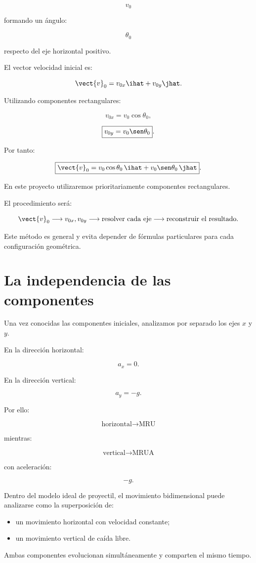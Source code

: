 \[
v_0
\]

formando un ángulo:

\[
\theta_0
\]

respecto del eje horizontal positivo.

El vector velocidad inicial es:

\[
\vect{v}_0
=
v_{0x}\ihat+v_{0y}\jhat.
\]

Utilizando componentes rectangulares:

\[
\boxed{
v_{0x}=v_0\cos\theta_0
},
\]

\[
\boxed{
v_{0y}=v_0\sen\theta_0
}.
\]

Por tanto:

\[
\boxed{
\vect{v}_0
=
v_0\cos\theta_0\,\ihat
+
v_0\sen\theta_0\,\jhat
}.
\]

\begin{recordatorio}
En este proyecto utilizaremos prioritariamente componentes rectangulares.

El procedimiento será:

\[
\vect{v}_0
\longrightarrow
v_{0x},v_{0y}
\longrightarrow
\text{resolver cada eje}
\longrightarrow
\text{reconstruir el resultado}.
\]

Este método es general y evita depender de fórmulas particulares para cada
configuración geométrica.
\end{recordatorio}


\section{La independencia de las componentes}

Una vez conocidas las componentes iniciales, analizamos por separado los ejes
\(x\) y \(y\).

En la dirección horizontal:

\[
a_x=0.
\]

En la dirección vertical:

\[
a_y=-g.
\]

Por ello:

\[
\boxed{
\text{horizontal}
\longrightarrow
\text{MRU}
}
\]

mientras:

\[
\boxed{
\text{vertical}
\longrightarrow
\text{MRUA}
}
\]

con aceleración:

\[
-g.
\]

\begin{principio}
Dentro del modelo ideal de proyectil, el movimiento bidimensional puede
analizarse como la superposición de:

\begin{itemize}
    \item un movimiento horizontal con velocidad constante;
    \item un movimiento vertical de caída libre.
\end{itemize}

Ambas componentes evolucionan simultáneamente y comparten el mismo tiempo.
\end{principio}

